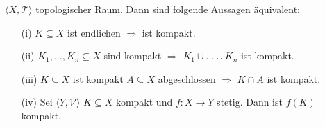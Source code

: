 \mprop{}
{
    $\langle X, \mathcal{T} \rangle$ topologischer Raum.
    Dann sind folgende Aussagen äquivalent:
    \begin{itemize}
        \item[(i)] $K \subseteq X$ ist endlichen $\Rightarrow$ ist kompakt.
        \item[(ii)] $K_1, \dots, K_n \subseteq X$ sind kompakt $\Rightarrow$ 
        $K_1 \cup \ldots \cup K_n$ ist kompakt.

        \item[(iii)] $K \subseteq X$ ist kompakt $A \subseteq X$ abgeschlossen $\Rightarrow$
        $K \cap A$ ist kompakt.
        \item[(iv)] Sei $\langle Y, \mathcal{V} \rangle$ $K \subseteq X$ kompakt
        und $f : X \to Y$ stetig. Dann ist $f(K)$ kompakt.
    \end{itemize}
}

